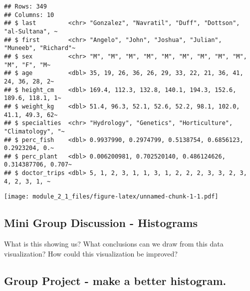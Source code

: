 \documentclass[
]{article}
\newenvironment{Shaded}{\begin{snugshade}}{\end{snugshade}}
\newcommand{\CommentTok}[1]{\textcolor[rgb]{0.56,0.35,0.01}{\textit{#1}}}
\newcommand{\FunctionTok}[1]{\textcolor[rgb]{0.00,0.00,0.00}{#1}}
\newcommand{\NormalTok}[1]{#1}
\newcommand{\SpecialCharTok}[1]{\textcolor[rgb]{0.00,0.00,0.00}{#1}}
\begin{document}
\begin{verbatim}
## Rows: 349
## Columns: 10
## $ last         <chr> "Gonzalez", "Navratil", "Duff", "Dottson", "al-Sultana", ~
## $ first        <chr> "Angelo", "John", "Joshua", "Julian", "Muneeb", "Richard"~
## $ sex          <chr> "M", "M", "M", "M", "M", "M", "M", "M", "M", "M", "F", "M~
## $ age          <dbl> 35, 19, 26, 36, 26, 29, 33, 22, 21, 36, 41, 24, 36, 28, 2~
## $ height_cm    <dbl> 169.4, 112.3, 132.8, 140.1, 194.3, 152.6, 189.6, 118.1, 1~
## $ weight_kg    <dbl> 51.4, 96.3, 52.1, 52.6, 52.2, 98.1, 102.0, 41.1, 49.3, 62~
## $ specialties  <chr> "Hydrology", "Genetics", "Horticulture", "Climatology", "~
## $ perc_fish    <dbl> 0.9937990, 0.2974799, 0.5138754, 0.6856123, 0.2923204, 0.~
## $ perc_plant   <dbl> 0.006200981, 0.702520140, 0.486124626, 0.314387706, 0.707~
## $ doctor_trips <dbl> 5, 1, 2, 3, 1, 1, 3, 1, 2, 2, 2, 3, 3, 2, 3, 4, 2, 3, 1, ~
\end{verbatim}

\begin{Shaded}
\end{Shaded}

\texttt{[image: module\_2\_1\_files/figure-latex/unnamed-chunk-1-1.pdf]}

\hypertarget{mini-group-discussion---histograms}{%
\subsection{Mini Group Discussion -
Histograms}\label{mini-group-discussion---histograms}}

What is this showing us? What conclusions can we draw from this data
visualization? How could this visualization be improved?

\hypertarget{group-project---make-a-better-histogram.}{%
\subsection{Group Project - make a better
histogram.}\label{group-project---make-a-better-histogram.}}
\end{document}
